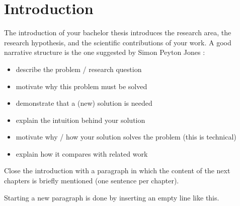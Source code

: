 \chapter{Introduction}\label{introduction}
The introduction of your bachelor thesis introduces the research area, the
research hypothesis, and the scientific contributions of your work.
A good narrative structure is the one suggested by Simon Peyton Jones
\cite{peys04:HowToWriteAGoodResearchPaper}:

\begin{itemize}
\item describe the problem / research question
\item motivate why this problem must be solved
\item demonstrate that a (new) solution is needed
\item explain the intuition behind your solution
\item motivate why / how your solution solves the problem (this is technical)
\item explain how it compares with related work
\end{itemize}

Close the introduction with a paragraph in which the content of the next chapters
is briefly mentioned (one sentence per chapter). 

Starting a new paragraph is done by inserting an empty line like this.
